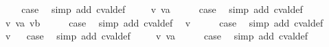 \begin{isabellebody}
\ \ \isamarkupfalse%
\ \isamarkupfalse%
\ {\isacharquery}case\ \isamarkupfalse%
\ {\isacharparenleft}simp\ add{\isacharcolon}\ cval{\isacharunderscore}def{\isacharparenright}\isanewline
{}\isamarkupfalse%
\isanewline
\ \ \isamarkupfalse%
\ {\isacharparenleft}{\isachardoublequoteopen}{}{\isacharunderscore}{}{}{\isachardoublequoteclose}\ v\ va{\isacharparenright}\isanewline
\ \ \isamarkupfalse%
\ \isamarkupfalse%
\ {\isacharquery}case\ \isamarkupfalse%
\ {\isacharparenleft}simp\ add{\isacharcolon}\ cval{\isacharunderscore}def{\isacharparenright}\isanewline
{}\isamarkupfalse%
\isanewline
{}\isamarkupfalse%
\ {\isacharparenleft}{\isachardoublequoteopen}{}{\isacharunderscore}{}{}{\isachardoublequoteclose}\ v\ va\ vb{\isacharparenright}\isanewline
\ \ \isamarkupfalse%
\ \isamarkupfalse%
\ {\isacharquery}case\ \isamarkupfalse%
\ {\isacharparenleft}simp\ add{\isacharcolon}\ cval{\isacharunderscore}def{\isacharparenright}\isanewline
{}\isamarkupfalse%
\isanewline
{}\isamarkupfalse%
\ {\isacharparenleft}{\isachardoublequoteopen}{}{\isacharunderscore}{}{}{\isachardoublequoteclose}\ v{\isacharparenright}\isanewline
\ \ \isamarkupfalse%
\ \isamarkupfalse%
\ {\isacharquery}case\ \isamarkupfalse%
\ {\isacharparenleft}simp\ add{\isacharcolon}\ cval{\isacharunderscore}def{\isacharparenright}\isanewline
{}\isamarkupfalse%
\isanewline
\ \ \isamarkupfalse%
\ {\isacharparenleft}{\isachardoublequoteopen}{}{\isacharunderscore}{}{}{\isachardoublequoteclose}\ v{\isacharparenright}\isanewline
{}\isamarkupfalse%
\ \isamarkupfalse%
\ {\isacharquery}case\ \isamarkupfalse%
\ {\isacharparenleft}simp\ add{\isacharcolon}\ cval{\isacharunderscore}def{\isacharparenright}\isanewline
{}\isamarkupfalse%
\isanewline
\ \ \isamarkupfalse%
\ {\isacharparenleft}{\isachardoublequoteopen}{}{\isacharunderscore}{}{}{\isachardoublequoteclose}\ v\ va{\isacharparenright}\isanewline
\ \ \isamarkupfalse%
\ \isamarkupfalse%
\ {\isacharquery}case\ \isamarkupfalse%
\ {\isacharparenleft}simp\ add{\isacharcolon}\ cval{\isacharunderscore}def{\isacharparenright}\isanewline

\end{isabellebody}
